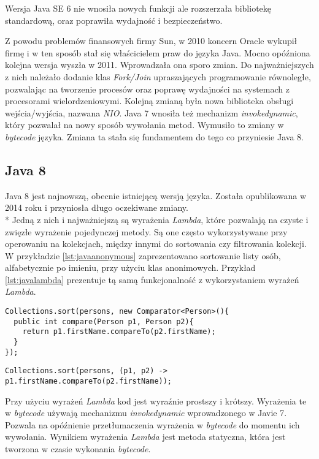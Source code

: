 Wersja Java SE 6 nie wnosiła nowych funkcji ale rozszerzała  bibliotekę standardową, oraz poprawiła wydajność i bezpieczeństwo.

Z powodu problemów finansowych firmy Sun, w 2010 koncern Oracle  wykupił firmę i w ten sposób stał się właścicielem praw do języka Java. Mocno opóźniona kolejna wersja wyszła w 2011. Wprowadzała ona sporo zmian. Do najważniejszych z nich należało dodanie klas \textsl{Fork/Join} upraszających programowanie równoległe, pozwalając na tworzenie procesów oraz poprawę wydajności na systemach z procesorami wielordzeniowymi. Kolejną zmianą była nowa biblioteka obsługi wejścia/wyjścia, nazwana \textsl{NIO}. Java 7 wnosiła też mechanizm \textsl{invokedynamic}, który pozwalał na nowy sposób wywołania metod. Wymusiło to zmiany w \textsl{bytecode} języka. Zmiana ta stała się fundamentem do tego co przyniesie Java 8.

\subsection{Java 8}
Java 8 jest najnowszą, obecnie istniejącą wersją języka. Została opublikowana w 2014 roku i przyniosła długo oczekiwane zmiany.\\*
Jedną z nich i najważniejszą są wyrażenia \textsl{Lambda}, które pozwalają na czyste i zwięzłe wyrażenie pojedynczej metody. Są one często wykorzystywane przy operowaniu na kolekcjach, między innymi do sortowania czy filtrowania kolekcji. W przykładzie \ref{lst:javaanonymous} zaprezentowano sortowanie listy osób, alfabetycznie po imieniu, przy użyciu klas anonimowych. Przykład \ref{lst:javalambda} prezentuje tą samą funkcjonalność z wykorzystaniem wyrażeń \textsl{Lambda}. 

\begin{lstlisting}[caption=Sortowanie kolekcji przy użyciu klas anonimowych, label={lst:javaanonymous}]
Collections.sort(persons, new Comparator<Person>(){
  public int compare(Person p1, Person p2){
    return p1.firstName.compareTo(p2.firstName);
  }
});
\end{lstlisting}

\begin{lstlisting}[caption=Sortowanie kolekcji przy użyciu wyrażeń \textsl{Lambda}, label={lst:javalambda}, aboveskip=0mm]
Collections.sort(persons, (p1, p2) -> p1.firstName.compareTo(p2.firstName));
\end{lstlisting}
 Przy użyciu wyrażeń \textsl{Lambda} kod jest wyraźnie prostszy i krótszy. Wyrażenia te w \textsl{bytecode} używają mechanizmu \textsl{invokedynamic} wprowadzonego w Javie 7. Pozwala na opóźnienie przetłumaczenia wyrażenia w \textsl{bytecode} do momentu ich wywołania. Wynikiem wyrażenia \textsl{Lambda} jest metoda statyczna, która jest tworzona w czasie wykonania \textsl{bytecode}.


